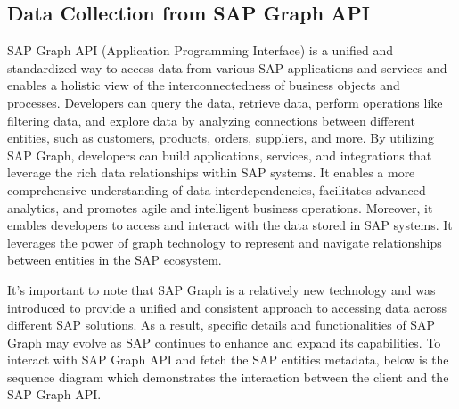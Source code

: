 \documentclass{article}
\begin{document}
\subsection{Data Collection from SAP Graph API}
SAP Graph API (Application Programming Interface) is a unified and standardized way to access data from various SAP applications and services and enables a holistic view of the interconnectedness of business objects and processes. Developers can query the data, retrieve data, perform operations like filtering data, and explore data by analyzing connections between different entities, such as customers, products, orders, suppliers, and more. By utilizing SAP Graph, developers can build applications, services, and integrations that leverage the rich data relationships within SAP systems. It enables a more comprehensive understanding of data interdependencies, facilitates advanced analytics, and promotes agile and intelligent business operations. Moreover, it enables developers to access and interact with the data stored in SAP systems. It leverages the power of graph technology to represent and navigate relationships between entities in the SAP ecosystem.

It's important to note that SAP Graph is a relatively new technology and was introduced to provide a unified and consistent approach to accessing data across different SAP solutions. As a result, specific details and functionalities of SAP Graph may evolve as SAP continues to enhance and expand its capabilities. To interact with SAP Graph API and fetch the SAP entities metadata, below is the sequence diagram which demonstrates the interaction between the client and the SAP Graph API.
\end{document}
